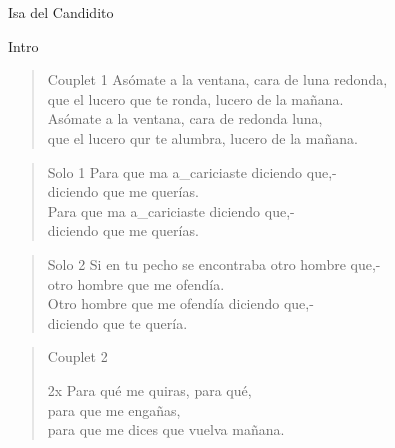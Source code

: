 \begin{song}[vals]{Isa del Candidito}
\begin{instrumental}{Intro}
\measure{}\measure{}\measure{}\measure{}
\measure{}\measure{}\measure{}\measure{}
\end{instrumental}

\begin{verse}{Couplet 1}
Asómate a la ventana, cara de luna redonda,\\
que el lucero que te ronda, lucero de la mañana.\\
Asómate a la ventana, cara de redonda luna,\\
que el lucero qur te alumbra, lucero de la mañana.\\
\end{verse}

\begin{verse}{Solo 1}
Para que ma a\_cariciaste diciendo que,-\\
diciendo que me querías.\\
Para que ma a\_cariciaste diciendo que,-\\
diciendo que me querías.\\
\end{verse}

\begin{verse}{Solo 2}
Si en tu pecho se encontraba otro hombre que,-\\
otro hombre que me ofendía.\\
Otro hombre que me ofendía diciendo que,-\\
diciendo que te quería.\\
\end{verse}

\begin{verse}{Couplet 2}
\begin{sidenote}{2x}
\chord{}Para qué me quiras, para qué,\\
para que me engañas,\\
para que me dices que vuelva mañana.\\
\end{sidenote}


\end{verse}
\end{song}
